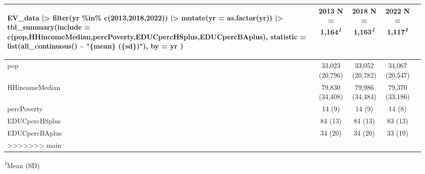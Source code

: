 \documentclass[
]{article}
\newenvironment{Shaded}{\begin{snugshade}}{\end{snugshade}}
\newcommand{\AttributeTok}[1]{\textcolor[rgb]{0.13,0.29,0.53}{#1}}
\newcommand{\DecValTok}[1]{\textcolor[rgb]{0.00,0.00,0.81}{#1}}
\newcommand{\FunctionTok}[1]{\textcolor[rgb]{0.13,0.29,0.53}{\textbf{#1}}}
\newcommand{\NormalTok}[1]{#1}
\newcommand{\SpecialCharTok}[1]{\textcolor[rgb]{0.81,0.36,0.00}{\textbf{#1}}}
\newcommand{\StringTok}[1]{\textcolor[rgb]{0.31,0.60,0.02}{#1}}
\begin{document}
\begin{table}[t]
\begin{tabular*}{\linewidth}{@{\extracolsep{\fill}}lcccc}
\begin{Shaded}
\begin{Highlighting}[]
\NormalTok{EV\_data }\SpecialCharTok{|\textgreater{}} \FunctionTok{filter}\NormalTok{(yr }\SpecialCharTok{\%in\%} \FunctionTok{c}\NormalTok{(}\DecValTok{2013}\NormalTok{,}\DecValTok{2018}\NormalTok{,}\DecValTok{2022}\NormalTok{)) }\SpecialCharTok{|\textgreater{}} 
        \FunctionTok{mutate}\NormalTok{(}\AttributeTok{yr =} \FunctionTok{as.factor}\NormalTok{(yr)) }\SpecialCharTok{|\textgreater{}}
        \FunctionTok{tbl\_summary}\NormalTok{(}\AttributeTok{include =} \FunctionTok{c}\NormalTok{(pop,HHincomeMedian,percPoverty,EDUCpercHSplus,EDUCpercBAplus),}
                       \AttributeTok{statistic =} \FunctionTok{list}\NormalTok{(}\FunctionTok{all\_continuous}\NormalTok{() }\SpecialCharTok{\textasciitilde{}} \StringTok{"\{mean\} (\{sd\})"}\NormalTok{),}
                    \AttributeTok{by =}\NormalTok{ yr )}
\end{Highlighting}
\end{Shaded}

\begin{table}[t]
\fontsize{12.0pt}{14.4pt}\selectfont
\begin{tabular*}{\linewidth}{@{\extracolsep{\fill}}lccc}
\toprule
\textbf{Characteristic} & \textbf{2013}  N = 1,164\textsuperscript{\textit{1}} & \textbf{2018}  N = 1,163\textsuperscript{\textit{1}} & \textbf{2022}  N = 1,117\textsuperscript{\textit{1}} \\ 
\midrule\addlinespace[2.5pt]
pop & 33,023 (20,796) & 33,052 (20,782) & 34,067 (20,547) \\ 
HHincomeMedian & 79,830 (34,408) & 79,986 (34,484) & 79,370 (33,186) \\ 
percPoverty & 14 (9) & 14 (9) & 14 (8) \\ 
EDUCpercHSplus & 84 (13) & 84 (13) & 83 (13) \\ 
EDUCpercBAplus & 34 (20) & 34 (20) & 33 (19) \\ 
>>>>>>> main
\bottomrule
\end{tabular*}
\begin{minipage}{\linewidth}
\textsuperscript{\textit{1}}Mean (SD)\\
\end{minipage}
\end{table}
\end{document}
